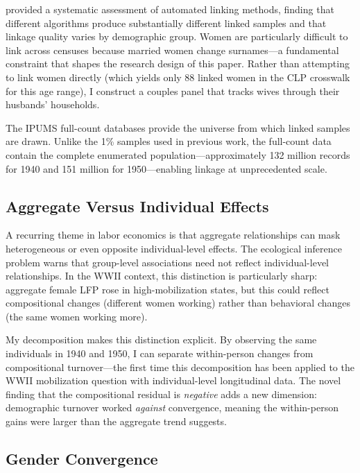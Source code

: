 \documentclass[12pt]{article}
\begin{document}
\citet{bailey2020howwell} provided a systematic assessment of automated linking methods, finding that different algorithms produce substantially different linked samples and that linkage quality varies by demographic group. Women are particularly difficult to link across censuses because married women change surnames---a fundamental constraint that shapes the research design of this paper. Rather than attempting to link women directly (which yields only 88 linked women in the CLP crosswalk for this age range), I construct a couples panel that tracks wives through their husbands' households.

The IPUMS full-count databases \citep{ruggles2024ipums, helgertz2023mlp} provide the universe from which linked samples are drawn. Unlike the 1\% samples used in previous work, the full-count data contain the complete enumerated population---approximately 132 million records for 1940 and 151 million for 1950---enabling linkage at unprecedented scale.

\subsection{Aggregate Versus Individual Effects}

A recurring theme in labor economics is that aggregate relationships can mask heterogeneous or even opposite individual-level effects. The ecological inference problem \citep{manski1990nonparametric} warns that group-level associations need not reflect individual-level relationships. In the WWII context, this distinction is particularly sharp: aggregate female LFP rose in high-mobilization states, but this could reflect compositional changes (different women working) rather than behavioral changes (the same women working more).

My decomposition makes this distinction explicit. By observing the same individuals in 1940 and 1950, I can separate within-person changes from compositional turnover---the first time this decomposition has been applied to the WWII mobilization question with individual-level longitudinal data. The novel finding that the compositional residual is \textit{negative} adds a new dimension: demographic turnover worked \textit{against} convergence, meaning the within-person gains were larger than the aggregate trend suggests.

\subsection{Gender Convergence}
\end{document}
